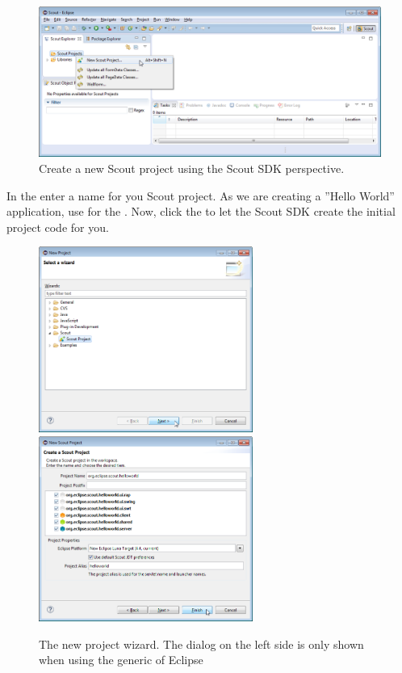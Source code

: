 \documentclass[a4paper,10pt,twoside]{book}
\begin{document}
\begin{figure}
\includegraphics[width=14cm]{sdk_create_new_scout_project.png}
\caption{Create a new Scout project using the Scout SDK perspective.}
\end{figure}

In the  enter a name for you Scout project. 
As we are creating a ''Hello World'' application, use  for the .
Now, click the  to let the Scout SDK create the initial project code for you.

\begin{figure}
\includegraphics[width=7cm]{sdk_new_project_1.png} \hspace{5mm}
\includegraphics[width=7cm]{sdk_new_project_2.png}
\caption{The new project wizard. The dialog on the left side is only shown when using the generic  of Eclipse}
\end{figure}
\end{document}

